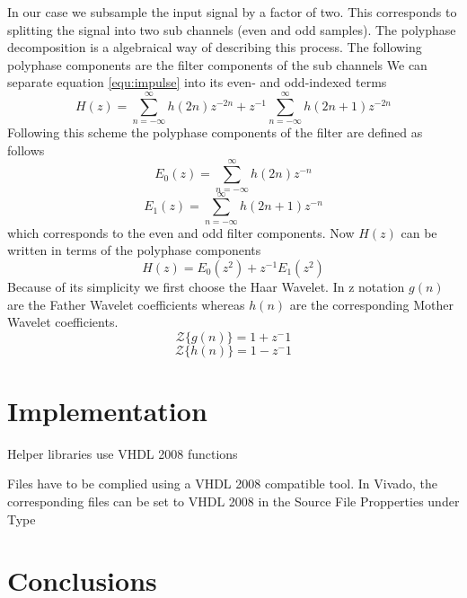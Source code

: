\begin{refsection}
In our case we subsample the input signal by a factor of two. This corresponds to splitting the signal into two sub channels (even and odd samples). The polyphase decomposition is a algebraical way of describing this process. The following polyphase components are the filter components of the sub channels 
We can separate equation \ref{equ:impulse} into its even- and odd-indexed terms
\begin{equation}
	H(z) = \sum_{n=-\infty}^{\infty} h(2n)z^{-2n} + z^{-1} \sum_{n=-\infty}^{\infty} h(2n+1)z^{-2n}
\end{equation}
Following this scheme the polyphase components of the filter are defined as follows
\begin{equation}
E_0(z) = \sum_{n=-\infty}^{\infty} h(2n)z^{-n}
\end{equation}
\begin{equation}
E_1(z) = \sum_{n=-\infty}^{\infty} h(2n+1)z^{-n}
\end{equation}
which corresponds to the even and odd filter components.
Now $H(z)$ can be written in terms of the polyphase components
\begin{equation}
H(z)=E_{0}(z^2)+z^{-1} E_1(z^2)
\end{equation}
Because of its simplicity we first choose the Haar Wavelet. In z notation
$g(n)$ are the Father Wavelet coefficients whereas $h(n)$ are the corresponding Mother Wavelet coefficients. 
\begin{equation}
{\mathcal {Z}} \{g(n)\} = 1 + z^-1
\end{equation}
\begin{equation}
{\mathcal {Z}} \{h(n)\} = 1 - z^-1
\end{equation}


\section{Implementation}


Helper libraries use VHDL 2008 functions

Files have to be complied using a VHDL 2008 compatible tool. In Vivado, the corresponding files can be set to VHDL 2008 in the Source File Propperties under Type 



\section{Conclusions}

\printbibliography[heading=subbibliography]
\end{refsection}

